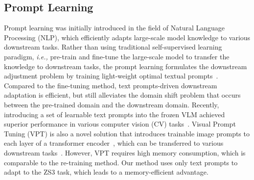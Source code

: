 \documentclass[nohyperref]{article}
\theoremstyle{plain}
\theoremstyle{definition}
\theoremstyle{remark}
\begin{document}
\subsection{Prompt Learning}
Prompt learning was initially introduced in the field of Natural Language Processing (NLP), which efficiently adapts large-scale model knowledge to various downstream tasks.
Rather than using traditional self-supervised learning paradigm,  \textit{i.e.,}  pre-train and fine-tune the large-scale model to transfer the knowledge to downstream tasks, 
the prompt learning formulates the downstream adjustment problem by training light-weight optimal textual prompts~\cite{petroni2019language,shin2020autoprompt,jiang2020can,liu2021gpt}. %
Compared to the fine-tuning method, text prompts-driven downstream adaptation is efficient, but still alleviates the domain shift problem that occurs between the pre-trained domain and the downstream domain. 
Recently, introducing a set of learnable text prompts into the frozen VLM achieved superior performance in various computer vision (CV) tasks~\cite{zhou2022learning, zhou2022conditional, gao2021clip,rao2022denseclip}. 
Visual Prompt Tuning (VPT) is also a novel solution that introduces trainable image prompts to each layer of a transformer encoder~\cite{jia2022visual}, %
which can be transferred to various downstream tasks~\cite{zang2022unified,sohn2022visual,liu2022prompt}. 
However, VPT requires high memory consumption, which is comparable to the re-training method. Our method uses only text prompts to adapt to the ZS3 task, which leads to a memory-efficient advantage.
\end{document}
